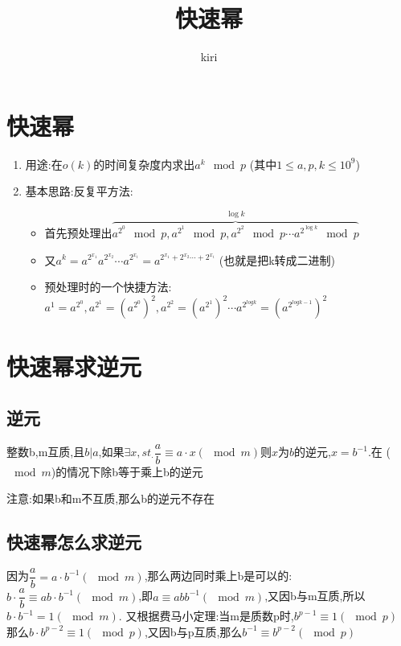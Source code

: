 \documentclass{ctexart}
\title{快速幂}
\author{kiri}
\begin{document}
\maketitle
\section{快速幂}
\begin{enumerate}
    \item 用途:在$o(k)$的时间复杂度内求出$a^k \mod p$ (其中$1\leq a,p,k\leq 10^9$)
    \item 基本思路:反复平方法:
    \begin{itemize}
        \item 首先预处理出$\overbrace{ a^{2^0} \mod p,a^{2^1}\mod p, a^{2^2}\mod p\cdots a^{2^{\log k}}\mod p}^{\log k}$
        \item 又$a^k=a^{2^{x_1}}a^{2^{x_2}}\cdots a^{2^{x_i}}=a^{2^{x_1}+2^{x_2}\cdots +2^{x_i}}$ (也就是把k转成二进制)
        \item 预处理时的一个快捷方法:$a^1=a^{2^0},a^{2^{1}}= (a^{2^{0}})^2,a^{2^{2}}=(a^{2^{1}})^2\cdots a^{2^{logk}}=(a^{2^{logk-1}})^2$
    \end{itemize}
\end{enumerate}
\section{快速幂求逆元}
\subsection{逆元}
整数b,m互质,且$b|a$,如果$\exists x,st_{\cdot}\dfrac{a}{b}\equiv a\cdot x(\mod m) $则$x$为$b$的逆元,$x=b^{-1}$.在 ($\mod m$)的情况下除b等于乘上b的逆元
\par 注意:如果b和m不互质,那么b的逆元不存在
\subsection{快速幂怎么求逆元}
因为$\dfrac{a}{b}=a\cdot b^{-1}(\mod m)$,那么两边同时乘上b是可以的:$b\cdot \dfrac{a}{b}\equiv ab\cdot b^{-1}(\mod m)$,即$a\equiv abb^{-1}(\mod m)$,又因b与m互质,所以$b\cdot b^{-1}=1(\mod m)$.
又根据费马小定理:当m是质数p时,$b^{p-1}\equiv 1(\mod p)$ 那么$b\cdot b^{p-2}\equiv 1(\mod p)$,又因b与p互质,那么$b^{-1}\equiv b^{p-2}(\mod p)$
\end{document}
